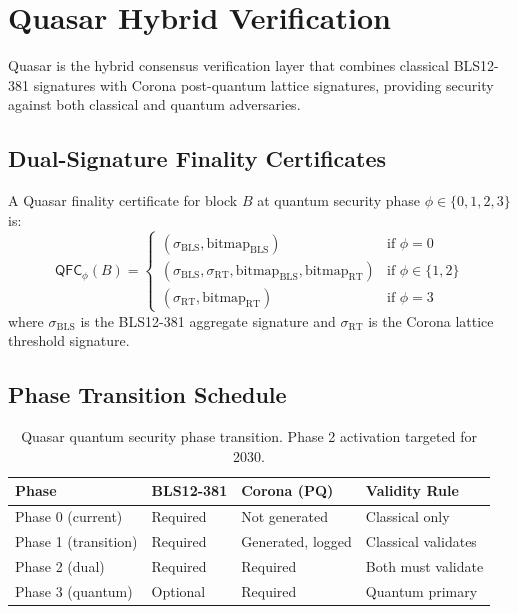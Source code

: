 \section{Quasar Hybrid Verification}
\label{sec:quasar}

Quasar is the hybrid consensus verification layer that combines classical BLS12-381 signatures with Corona post-quantum lattice signatures, providing security against both classical and quantum adversaries.

\subsection{Dual-Signature Finality Certificates}

\begin{definition}
A Quasar finality certificate for block $B$ at quantum security phase $\phi \in \{0, 1, 2, 3\}$ is:
\begin{equation}
\mathsf{QFC}_\phi(B) = \begin{cases}
(\sigma_{\text{BLS}}, \text{bitmap}_{\text{BLS}}) & \text{if } \phi = 0 \\
(\sigma_{\text{BLS}}, \sigma_{\text{RT}}, \text{bitmap}_{\text{BLS}}, \text{bitmap}_{\text{RT}}) & \text{if } \phi \in \{1, 2\} \\
(\sigma_{\text{RT}}, \text{bitmap}_{\text{RT}}) & \text{if } \phi = 3
\end{cases}
\end{equation}
where $\sigma_{\text{BLS}}$ is the BLS12-381 aggregate signature and $\sigma_{\text{RT}}$ is the Corona lattice threshold signature.
\end{definition}

\subsection{Phase Transition Schedule}

\begin{table}[h]
\centering
\begin{tabular}{llll}
\toprule
\textbf{Phase} & \textbf{BLS12-381} & \textbf{Corona (PQ)} & \textbf{Validity Rule} \\
\midrule
Phase 0 (current) & Required & Not generated & Classical only \\
Phase 1 (transition) & Required & Generated, logged & Classical validates \\
Phase 2 (dual) & Required & Required & Both must validate \\
Phase 3 (quantum) & Optional & Required & Quantum primary \\
\bottomrule
\end{tabular}
\caption{Quasar quantum security phase transition. Phase 2 activation targeted for 2030.}
\label{tab:quasar-phases}
\end{table}

